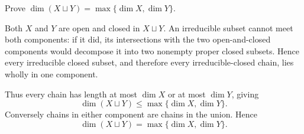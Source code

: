 \begin{problem}\label{prob:vi30-06}
Prove \(\dim(X\sqcup Y)=\max\{\dim X,\dim Y\}\).

\end{problem}

\ifdefined\FullProblemDossiers
\begin{solution}
Both \(X\) and \(Y\) are open and closed in \(X\sqcup Y\). An irreducible subset cannot meet both components:
if it did, its intersections with the two open-and-closed components would decompose it into two nonempty proper
closed subsets. Hence every irreducible closed subset, and therefore every irreducible-closed chain, lies wholly in
one component.

Thus every chain has length at most \(\dim X\) or at most \(\dim Y\), giving
\[
\dim(X\sqcup Y)\le\max\{\dim X,\dim Y\}.
\]
Conversely chains in either component are chains in the union. Hence
\[
\boxed{\dim(X\sqcup Y)=\max\{\dim X,\dim Y\}}.
\]
\end{solution}
\fi
